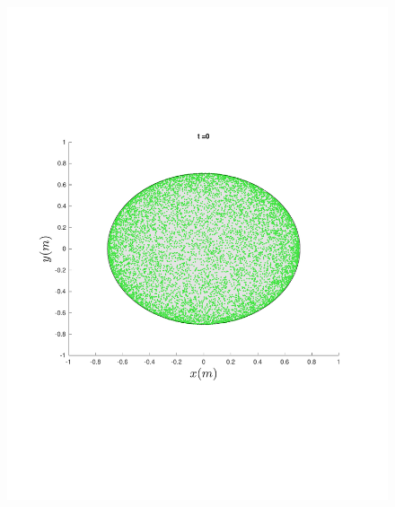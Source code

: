 \begin{figure}
{\begin{minipage}{0.5\textwidth}
\begin{minipage}[b]{0.5\textwidth}
        \includegraphics[width=\textwidth]{figures/method/FunnelSimOverlaid1funnel-1}
      \end{minipage}%
      \begin{minipage}[b]{0.5\textwidth}

\end{minipage}
\end{minipage}}
\end{figure}
